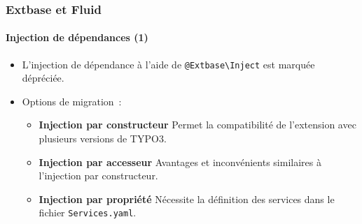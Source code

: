 %

\begin{frame}[fragile]
	\frametitle{Extbase et Fluid}
	\framesubtitle{Injection de dépendances (1)}


	\begin{itemize}
		\item L'injection de dépendance à l'aide de
			\small\texttt{@Extbase\textbackslash Inject}\normalsize\newline
			est marquée dépréciée.

		\item Options de migration~:

			\begin{itemize}\small
				\item \textbf{Injection par constructeur}\newline
				 	Permet la compatibilité de l'extension avec plusieurs versions de TYPO3.
				\item \textbf{Injection par accesseur}\newline
					Avantages et inconvénients similaires à l'injection par constructeur.
				\item \textbf{Injection par propriété}\newline
					Nécessite la définition des services dans le fichier \texttt{Services.yaml}.
			\end{itemize}\normalsize

	\end{itemize}

\end{frame}

